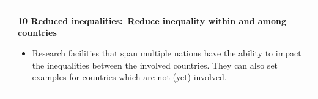 \documentclass[../SustainableHEP.tex]{subfiles}
\begin{document}
\begin{longtable*}{l l}
\parbox[t]{\SDGleft\textwidth}{} & \parbox[t]{\SDGright\textwidth}{\textbf{10 Reduced inequalities:\ Reduce inequality within and among countries}
\vspace{\recskip}
\begin{itemize}[leftmargin=20pt]
\setlength{\itemsep}{\recskip}
\item Research facilities that span multiple nations have the ability to impact the inequalities between the involved countries. They can also set examples for countries which are not (yet) involved.
\end{itemize}}\\


\end{longtable*}
\end{document}
